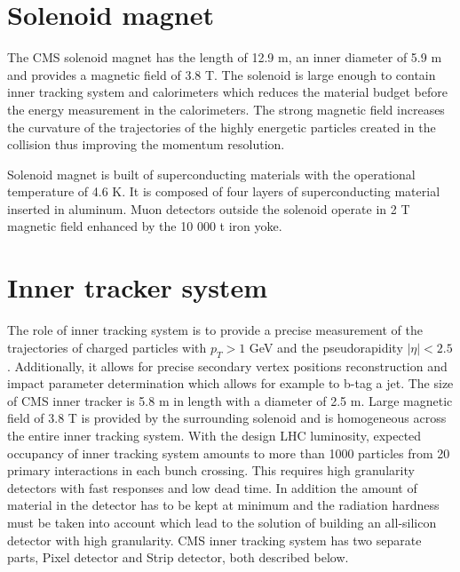 \section{Solenoid magnet}

The CMS solenoid magnet has the length of 12.9 m, an inner diameter of 5.9 m and provides a magnetic field of 3.8 T. The solenoid is large enough to contain inner tracking system and calorimeters  which reduces the material budget before the energy measurement in the calorimeters. The strong magnetic field increases the curvature of the trajectories of the highly energetic particles created in the collision thus improving the momentum resolution.
\par Solenoid magnet is built of superconducting materials with the operational temperature of 4.6 K. It is composed of four layers of superconducting material inserted in aluminum. Muon detectors outside the solenoid operate in 2 T magnetic field enhanced by the 10 000 t iron yoke.  


\section{Inner tracker system}

The role of inner tracking system is to provide a precise measurement of the trajectories of charged particles with $p_T>1$ GeV and the pseudorapidity $|\eta|<2.5$. Additionally, it allows for precise secondary vertex positions reconstruction and impact parameter determination which allows for example to b-tag a jet. The size of CMS inner tracker is 5.8 m in length with a diameter of 2.5 m. Large magnetic field of 3.8 T is provided by the surrounding solenoid and is homogeneous across the entire inner tracking system. With the design LHC luminosity, expected occupancy of inner tracking system amounts to more than 1000 particles from 20 primary interactions in each bunch crossing. This requires high granularity detectors with fast responses and low dead time. In addition the amount of material in the detector has to be kept at minimum and the radiation hardness must be taken into account which lead to the solution of building an all-silicon detector with high granularity. CMS inner tracking system has two separate parts, Pixel detector and Strip detector, both described below.    


